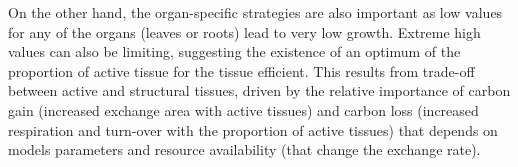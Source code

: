 
\begin{figure}%
    \classiccaptionstyle
{}
\end{figure}

On the other hand, the organ-specific strategies are also important as low values for any of the organs (leaves or roots) lead to very low growth. Extreme high values can also be limiting, suggesting the existence of an optimum of the proportion of active tissue for the tissue efficient. This  results from trade-off between active and structural tissues, driven by the relative importance of carbon gain (increased exchange area with active tissues) and carbon loss (increased respiration and turn-over with the proportion of active tissues) that depends on models parameters and resource availability (that change the exchange rate).

